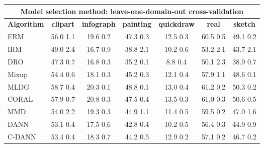 \documentclass{article}
\begin{document}
\begin{center}
\begin{tabular}{lcccccc}
\toprule
\multicolumn{7}{c}{\textbf{Model selection method: leave-one-domain-out cross-validation}} \\
\midrule
\textbf{Algorithm}    & \textbf{clipart} & \textbf{infograph} & \textbf{painting} & \textbf{quickdraw} & \textbf{real} & \textbf{sketch}     \\
\midrule
ERM                 &      56.0  1.1     &       19.6  0.2  &          47.3  0.3    &        12.5  0.3      &      60.5  0.5     &       49.1  0.2 \\            
IRM                 &      49.0  2.4     &       16.7  0.9  &          38.8  2.1    &        10.2  0.6      &      53.2  2.1     &       43.7  2.1 \\            
DRO           &      47.3  0.7     &       16.8  0.3  &          35.2  0.1    &        8.8  0.4       &      50.1  2.3     &       38.9  0.7 \\            
Mixup               &      54.4  0.6     &       18.1  0.3  &          45.2  0.3    &        12.1  0.4      &      57.9  1.1     &       48.6  0.1 \\            
MLDG                &      58.7  0.4     &       20.3  0.1  &          48.8  0.1    &        13.0  0.4      &      61.2  0.2     &       50.3  0.2 \\            
CORAL               &      57.9  0.7     &       20.8  0.3  &          47.5  0.4    &        13.5  0.3      &      61.0  0.3     &       50.6  0.5 \\            
MMD                 &      54.0  2.2     &       19.3  0.3  &          44.9  1.1    &        11.4  0.5      &      59.5  0.2     &       47.0  1.6 \\            
DANN                 &      53.1  0.4     &       17.5  0.6  &          42.8  0.4    &        10.2  0.5      &      56.4  0.3     &       44.9  0.9 \\            
C-DANN             &      53.4  0.4     &       18.3  0.7  &          44.2  0.5    &        12.9  0.2      &      57.1  0.2     &       46.7  0.2 \\            
\bottomrule
\end{tabular}
\end{center}
\end{document}
